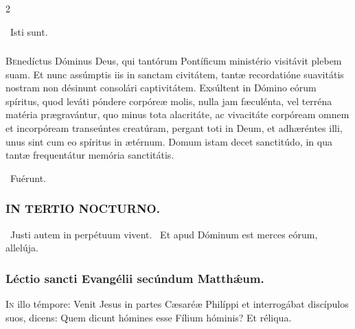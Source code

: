 \documentclass[9pt,twoside]{extarticle}
\begin{document}
\begin{multicols}{2}
\begin{tightlist}{}
\item {}~Isti sunt.
\end{tightlist}

\subsubsection*{\center {}}
\lettrine{B}enedíctus Dóminus Deus, qui tantórum Pontíficum ministério visitávit plebem suam. Et nunc assúmptis iis in sanctam civitátem, tantæ recordatióne suavitátis nostram non désinunt consolári captivitátem. Exsúltent in Dómino eórum spíritus, quod leváti póndere corpóreæ molis, nulla jam fæculénta, vel terréna matéria prægravántur, quo minus tota alacritáte, ac vivacitáte corpóream omnem et incorpóream transeúntes creatúram, pergant toti in Deum, et adhæréntes illi, unus sint cum eo spíritus in ætérnum. Domum istam decet sanctitúdo, in qua tantæ frequentátur memória sanctitátis.

\begin{tightlist}{}
\item {}~Fuérunt.
\end{tightlist}

\subsubsection*{\center \textsc{IN TERTIO NOCTURNO.}}
\begin{tightlist}{}
\item {}~Justi autem in perpétuum vivent. ~Et apud Dóminum est merces eórum, allelúja.
\end{tightlist}

\subsubsection*{\center Léctio sancti Evangélii secúndum Matthǽum.}
\begin{center}\end{center}
\lettrine{I}n illo témpore: Venit Jesus in partes Cæsaréæ Philíppi et interrogábat discípulos suos, dicens: Quem dicunt hómines esse Fílium hóminis? Et réliqua.


\end{multicols}
\end{document}
